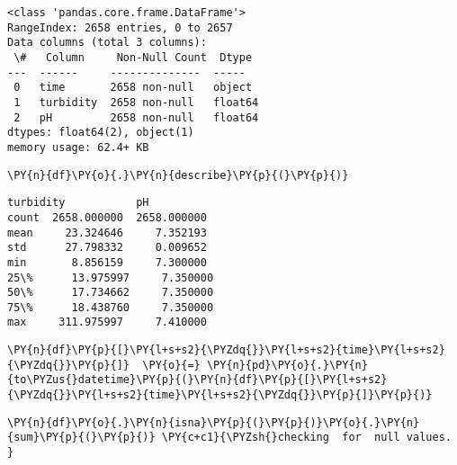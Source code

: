     \begin{Verbatim}[commandchars=\\\{\}]
<class 'pandas.core.frame.DataFrame'>
RangeIndex: 2658 entries, 0 to 2657
Data columns (total 3 columns):
 \#   Column     Non-Null Count  Dtype
---  ------     --------------  -----
 0   time       2658 non-null   object
 1   turbidity  2658 non-null   float64
 2   pH         2658 non-null   float64
dtypes: float64(2), object(1)
memory usage: 62.4+ KB
    \end{Verbatim}

    \begin{tcolorbox}[breakable, size=fbox, boxrule=1pt, pad at break*=1mm,colback=cellbackground, colframe=cellborder]
\begin{Verbatim}[commandchars=\\\{\}]
\PY{n}{df}\PY{o}{.}\PY{n}{describe}\PY{p}{(}\PY{p}{)}
\end{Verbatim}
\end{tcolorbox}

            \begin{tcolorbox}[breakable, size=fbox, boxrule=.5pt, pad at break*=1mm, opacityfill=0]
\begin{Verbatim}[commandchars=\\\{\}]
         turbidity           pH
count  2658.000000  2658.000000
mean     23.324646     7.352193
std      27.798332     0.009652
min       8.856159     7.300000
25\%      13.975997     7.350000
50\%      17.734662     7.350000
75\%      18.438760     7.350000
max     311.975997     7.410000
\end{Verbatim}
\end{tcolorbox}
        
    \begin{tcolorbox}[breakable, size=fbox, boxrule=1pt, pad at break*=1mm,colback=cellbackground, colframe=cellborder]
\begin{Verbatim}[commandchars=\\\{\}]
\PY{n}{df}\PY{p}{[}\PY{l+s+s2}{\PYZdq{}}\PY{l+s+s2}{time}\PY{l+s+s2}{\PYZdq{}}\PY{p}{]}  \PY{o}{=} \PY{n}{pd}\PY{o}{.}\PY{n}{to\PYZus{}datetime}\PY{p}{(}\PY{n}{df}\PY{p}{[}\PY{l+s+s2}{\PYZdq{}}\PY{l+s+s2}{time}\PY{l+s+s2}{\PYZdq{}}\PY{p}{]}\PY{p}{)}
\end{Verbatim}
\end{tcolorbox}

    \begin{tcolorbox}[breakable, size=fbox, boxrule=1pt, pad at break*=1mm,colback=cellbackground, colframe=cellborder]
\begin{Verbatim}[commandchars=\\\{\}]
\PY{n}{df}\PY{o}{.}\PY{n}{isna}\PY{p}{(}\PY{p}{)}\PY{o}{.}\PY{n}{sum}\PY{p}{(}\PY{p}{)} \PY{c+c1}{\PYZsh{}checking  for  null values. }
\end{Verbatim}
\end{tcolorbox}

